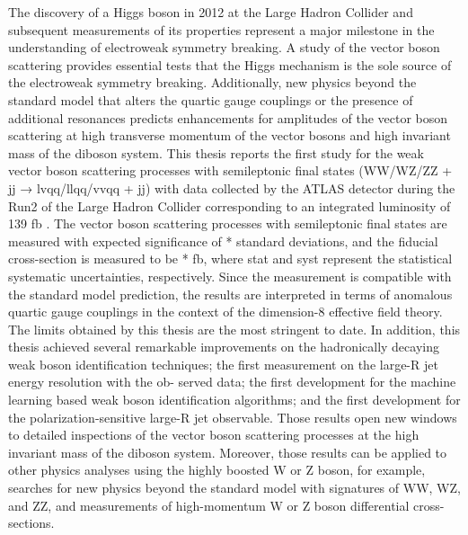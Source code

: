 The discovery of a Higgs boson in 2012 at the Large Hadron Collider and subsequent measurements of its properties represent a major milestone in the understanding of electroweak symmetry breaking. A study of the vector boson scattering provides essential tests that the Higgs mechanism is the sole source of the electroweak symmetry breaking. Additionally, new physics beyond the standard model that alters the quartic gauge couplings or the presence of additional resonances predicts enhancements for amplitudes of the vector boson scattering at high transverse momentum of the vector bosons and high invariant mass of the diboson system.
This thesis reports the first study for the weak vector boson scattering processes with semileptonic final states (WW/WZ/ZZ + jj → lvqq/llqq/vvqq + jj) with data collected by the ATLAS detector during the Run2 of the Large Hadron Collider corresponding to an integrated luminosity of 139 fb
.
The vector boson scattering processes with semileptonic final states are measured with expected significance of * standard deviations, and the fiducial cross-section is measured to be * fb, where stat and syst represent the statistical systematic uncertainties, respectively.
Since the measurement is compatible with the standard model prediction, the results are interpreted in terms of anomalous quartic gauge couplings in the context of the dimension-8 effective field theory. The limits obtained by this thesis are the most stringent to date.
In addition, this thesis achieved several remarkable improvements on the hadronically decaying weak boson identification techniques; the first measurement on the large-R jet energy resolution with the ob- served data; the first development for the machine learning based weak boson identification algorithms; and the first development for the polarization-sensitive large-R jet observable. Those results open new windows to detailed inspections of the vector boson scattering processes at the high invariant mass of the diboson system. Moreover, those results can be applied to other physics analyses using the highly boosted W or Z boson, for example, searches for new physics beyond the standard model with signatures of WW, WZ, and ZZ, and measurements of high-momentum W or Z boson differential cross-sections.

